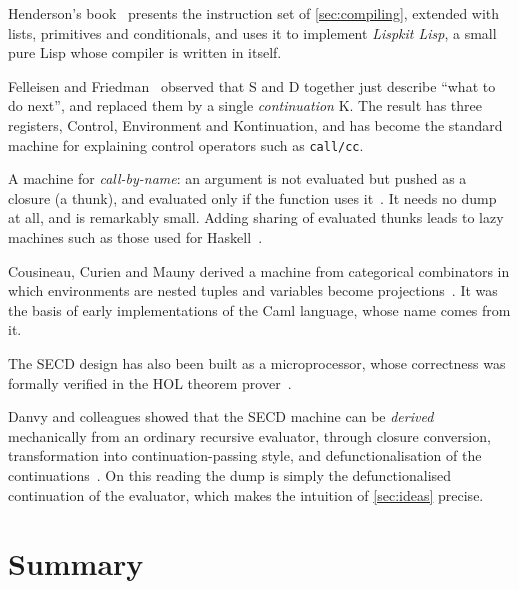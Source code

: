 \documentclass[11pt,a4paper]{article}
\theoremstyle{definition}
\theoremstyle{plain}
\begin{document}
\begin{description}[style=nextline, leftmargin=1.2em, itemsep=3pt]
\item[Compiled SECD.] Henderson's book~\cite{henderson80} presents the
  instruction set of \cref{sec:compiling}, extended with lists, primitives and
  conditionals, and uses it to implement \emph{Lispkit Lisp}, a small pure
  Lisp whose compiler is written in itself.
\item[The CEK machine.] Felleisen and Friedman~\cite{felleisen87} observed
  that S and D together just describe ``what to do next'', and replaced them
  by a single \emph{continuation} K. The result has three registers, Control,
  Environment and Kontinuation, and has become the standard machine for
  explaining control operators such as \texttt{call/cc}.
\item[The Krivine machine.] A machine for \emph{call-by-name}: an argument
  is not evaluated but pushed as a closure (a thunk), and evaluated only if the
  function uses it~\cite{krivine07}. It needs no dump at all, and is
  remarkably small. Adding sharing of evaluated thunks leads to lazy
  machines such as those used for Haskell~\cite{peytonjones87}.
\item[The Categorical Abstract Machine.] Cousineau, Curien and Mauny
  derived a machine from categorical combinators in which environments are
  nested tuples and variables become projections~\cite{cam87}. It was the
  basis of early implementations of the Caml language, whose name comes
  from it.
\item[Hardware.] The SECD design has also been built as a microprocessor,
  whose correctness was formally verified in the HOL theorem
  prover~\cite{graham92}.
\item[Derivation, not invention.] Danvy and colleagues showed that the SECD
  machine can be \emph{derived} mechanically from an ordinary recursive
  evaluator, through closure conversion, transformation into
  continuation-passing style, and defunctionalisation of the
  continuations~\cite{ager03,danvy-secd}. On this reading the dump is
  simply the defunctionalised continuation of the evaluator, which makes
  the intuition of \cref{sec:ideas} precise.
\end{description}

\section{Summary}
\end{document}

